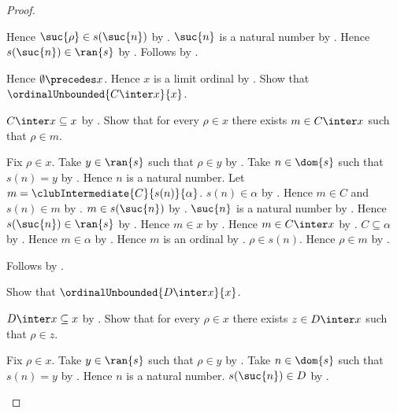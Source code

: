 \begin{proof}
\begin{subproof}
        Hence $\suc{\rho}\in s(\suc{n})$
            by .
        $\suc{n}$ is a natural number by .
        Hence $s(\suc{n})\in\ran{s}$ by .
        Follows by .
    \end{subproof}
    Hence $\emptyset\precedes x$.
    Hence $x$ is a limit ordinal by .
    Show that $\ordinalUnbounded{C\inter x}{x}$.
    \begin{subproof}
        $C\inter x\subseteq x$ by .
        Show that for every $\rho\in x$ there exists $m\in C\inter x$
            such that $\rho\in m$.
        \begin{subproof}
            Fix $\rho\in x$.
            Take $y\in\ran{s}$ such that $\rho\in y$
                by .
            Take $n\in\dom{s}$ such that $s(n)=y$
                by .
            Hence $n$ is a natural number.
            Let $m=\clubIntermediate{C}{s(n)}{\alpha}$.
            $s(n)\in\alpha$ by .
            Hence $m\in C$ and $s(n)\in m$
                by .
            $m\in s(\suc{n})$
                by .
            $\suc{n}$ is a natural number by .
            Hence $s(\suc{n})\in\ran{s}$ by .
            Hence $m\in x$ by .
            Hence $m\in C\inter x$ by .
            $C\subseteq\alpha$ by .
            Hence $m\in\alpha$ by .
            Hence $m$ is an ordinal by .
            $\rho\in s(n)$.
            Hence $\rho\in m$ by .
        \end{subproof}
        Follows by .
    \end{subproof}
    Show that $\ordinalUnbounded{D\inter x}{x}$.
    \begin{subproof}
        $D\inter x\subseteq x$ by .
        Show that for every $\rho\in x$ there exists $z\in D\inter x$
            such that $\rho\in z$.
        \begin{subproof}
            Fix $\rho\in x$.
            Take $y\in\ran{s}$ such that $\rho\in y$
                by .
            Take $n\in\dom{s}$ such that $s(n)=y$
                by .
            Hence $n$ is a natural number.
            $s(\suc{n})\in D$
                by .

\end{subproof}
\end{subproof}
\end{proof}
